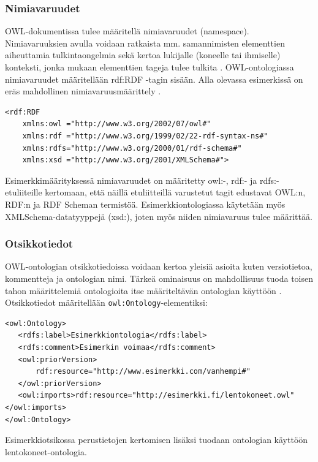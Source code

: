 \documentclass[finnish]{tktltiki2}
\theoremstyle{definition}
\theoremstyle{remark}
\begin{document}
\subsubsection{Nimiavaruudet}
OWL-dokumentissa tulee määritellä nimiavaruudet (namespace). Nimiavaruuksien
avulla voidaan ratkaista mm. samannimisten elementtien aiheuttamia
tulkintaongelmia sekä kertoa lukijalle (koneelle tai ihmiselle) konteksti, jonka
mukaan elementtien tageja tulee tulkita \cite{SWM04}. OWL-ontologiassa nimiavaruudet
määritellään rdf:RDF -tagin sisään.  Alla olevassa esimerkissä on eräs mahdollinen nimiavaruusmäärittely . 
\begin{verbatim}
<rdf:RDF
    xmlns:owl ="http://www.w3.org/2002/07/owl#"
    xmlns:rdf ="http://www.w3.org/1999/02/22-rdf-syntax-ns#"
    xmlns:rdfs="http://www.w3.org/2000/01/rdf-schema#"
    xmlns:xsd ="http://www.w3.org/2001/XMLSchema#">
\end{verbatim}
Esimerkkimäärityksessä nimiavaruudet on määritetty owl:-, rdf:- ja rdfs:-etuliiteille kertomaan, että näillä
etuliitteillä varustetut tagit edustavat OWL:n, RDF:n ja RDF Scheman termistöä.
Esimerkkiontologiassa käytetään myös XMLSchema-datatyyppejä (xsd:), joten myös niiden
nimiavaruus tulee määrittää. 

\subsubsection{Otsikkotiedot}
OWL-ontologian otsikkotiedoissa voidaan kertoa yleisiä asioita kuten versiotietoa, kommentteja ja ontologian nimi. Tärkeä ominaisuus on mahdollisuus tuoda toisen tahon määrittelemiä ontologioita itse määriteltävän ontologian käyttöön \cite{SWM04}. Otsikkotiedot määritellään \texttt{owl:Ontology}-elementiksi: 
\begin{verbatim}
<owl:Ontology>
   <rdfs:label>Esimerkkiontologia</rdfs:label>
   <rdfs:comment>Esimerkin voimaa</rdfs:comment>
   <owl:priorVersion>
       rdf:resource="http://www.esimerkki.com/vanhempi#"
   </owl:priorVersion>
   <owl:imports>rdf:resource="http://esimerkki.fi/lentokoneet.owl"</owl:imports>
</owl:Ontology>
\end{verbatim}
Esimerkkiotsikossa perustietojen kertomisen lisäksi tuodaan ontologian käyttöön lentokoneet-ontologia. 
\end{document}
